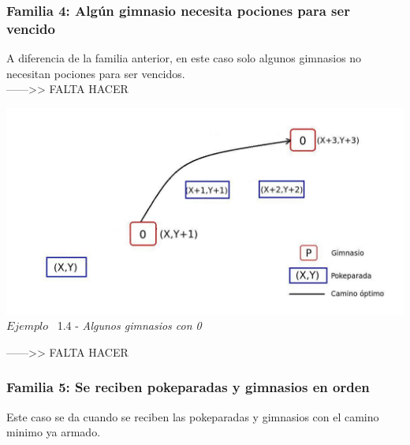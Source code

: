 \begin{center}
  \subsubsection*{Familia 4: Alg\'un gimnasio necesita pociones para ser vencido}
\end{center}

A diferencia de la familia anterior, en este caso solo algunos gimnasios no necesitan pociones para ser vencidos.\\

------>> FALTA HACER
\vspace*{0.3cm} \vspace*{0.3cm}
  \begin{center}
 \includegraphics[scale=0.6]{./EJ1/gym0.jpeg}
\\ {$Ejemplo$ \ 1.4 - \textit{Algunos gimnasios con 0}}
  \end{center}
  \vspace*{0.3cm}
------>> FALTA HACER\\

\begin{center}
  \subsubsection*{Familia 5: Se reciben pokeparadas y gimnasios en orden}
\end{center}

Este caso se da cuando se reciben las pokeparadas y gimnasios con el camino minimo ya armado.

